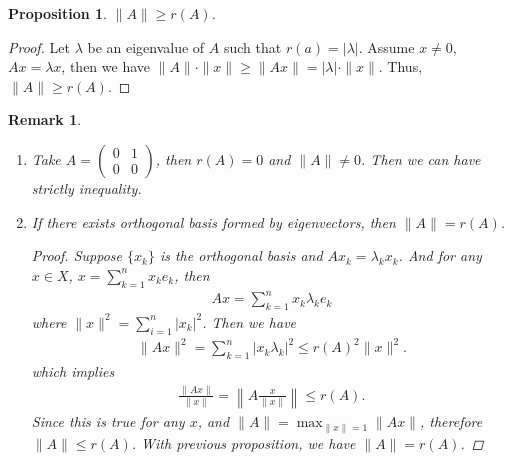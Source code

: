 \documentclass[11pt]{book}
\newtheorem{proposition}{Proposition}[section]
\newtheorem{remark}{Remark}[section]
\theoremstyle{definition}
\numberwithin{equation}{subsection}
\begin{document}
\begin{proposition}
$\|A\| \geq r(A)$.
\end{proposition}
\begin{proof}
Let $\lambda$ be an eigenvalue of $A$ such that $r(a) = \left|\lambda\right|$. Assume $x\neq 0$, $Ax = \lambda x$, then we have $\|A\|\cdot \|x\| \geq \|Ax\| = |\lambda|\cdot \|x\|$. Thus, $\|A\| \geq r(A)$.
\end{proof}

\begin{remark}
~\begin{enumerate}[label=(\arabic*)]
    \item Take $A = \begin{pmatrix}
    0 & 1  \\
    0 & 0  
    \end{pmatrix}$, then $r(A) = 0$ and $\|A\| \neq 0$. Then we can have strictly inequality.
    \item If there exists orthogonal basis formed by eigenvectors, then $\|A\| = r(A)$.
    \begin{proof}
    Suppose $\{x_k\}$ is the orthogonal basis and $Ax_k = \lambda_k x_k$. And for any $x\in X$, $x = \sum^n_{k=1}x_k e_k$, then 
    \begin{align*}
        Ax = \sum^n_{k=1} x_k \lambda_k e_k
    \end{align*}
    where $\|x\|^2 = \sum^n_{i=1}|x_k|^2$. Then we have 
    \begin{align*}
        \|Ax\|^2 = \sum^n_{k=1} |x_k \lambda_k|^2 \leq r(A)^2 \|x\|^2. 
    \end{align*} 
    which implies 
    \begin{align*}
        \frac{\|Ax\|}{\|x\|} = \left\|A \frac{x}{\|x\|}\right\| \leq r(A).
    \end{align*}
    Since this is true for any $x$, and $\|A\| = \max_{\|x\|=1}\|Ax\|$, therefore $\|A\|\leq r(A)$. With previous proposition, we have $\|A\| = r(A)$.
    \end{proof}
\end{enumerate}
\end{remark}

\medskip
\end{document}
